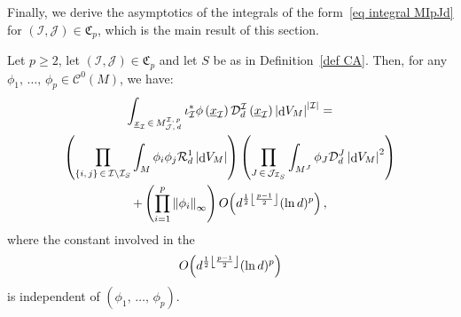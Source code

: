 \documentclass[AHL,Unicode,longabstracts,published]{cedram}
\DeclareMathOperator{\dmesure}{d}
\DeclarePairedDelimiter{\floor}{\lfloor}{\rfloor}
\newcommand{\D}{\mathcal{D}}
\newcommand{\I}{\mathcal{I}}
\newcommand{\J}{\mathcal{J}}
\newcommand{\clC}{\mathcal{C}}
\newcommand{\clR}{\mathcal{R}}
\newcommand{\frkC}{\mathfrak{C}}
\newcommand{\norm}[1]{\left\lvert #1 \right\rvert}
\newcommand{\Norm}[1]{\left\lVert #1 \right\rVert}
\newcommand{\rmes}[1]{\norm{\dmesure\! V_{#1}}}
\renewcommand{\geq}{\geqslant}
\begin{document}
Finally, we derive the asymptotics of the integrals of the form~\eqref{eq integral MIpJd} for $(\I,\J) \in \frkC_p$, which is the main result of this section.

\begin{lemm}\label{lem leading term}
Let $p \geq 2$, let $(\I,\J) \in \frkC_p$ and let $S$ be as in Definition~\ref{def CA}. Then, for any $\phi_1,\,\dots,\,\phi_p \in \clC^0(M)$, we have:
\begin{multline*}
\int_{\underline{x}_\I\,\in\,M^{\I,\,p}_{\J,\,d}}\iota_\I^*\phi\left(\underline{x}_\I\right) \D^\I_d\left(\underline{x}_\I\right) \rmes{M}^{\norm{\I}}= \\
\left(\prod_{\{i,\,j\}\,\in\,\I \setminus \I_S} \int_M \phi_i\phi_j\clR^1_d \rmes{M}\right)\left(\prod_{J\,\in\,\J_{\I_S}} \int_{M^J} \phi_J \D_d^J \rmes{M}^2 \right)\\
+ \left(\prod_{i=1}^p \Norm{\phi_i}_\infty\right) O\!\left(d^{\frac{1}{2}\floor*{\frac{p-1}{2}}}(\ln d)^p\right),
\end{multline*}
where the constant involved in the
\[
O\!\left(d^{\frac{1}{2}\floor*{\frac{p-1}{2}}}(\ln d)^p\right)\]
is independent of $(\phi_1,\,\dots,\,\phi_p)$.
\end{lemm}
\end{document}
